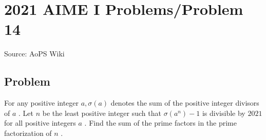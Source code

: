 \documentclass[12pt]{article}
\begin{document}
\section*{{2021 AIME I Problems/Problem 14}}
Source: AoPS Wiki

\subsection*{Problem}
For any positive integer $a, \sigma(a)$ denotes the sum of the positive integer divisors of $a$ . Let $n$ be the least positive integer such that $\sigma(a^n)-1$ is divisible by $2021$ for all positive integers $a$ . Find the sum of the prime factors in the prime factorization of $n$ .
\end{document}
